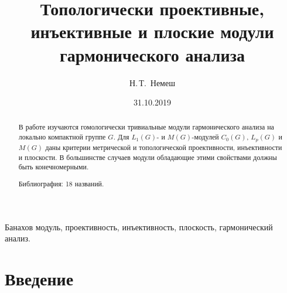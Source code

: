 \documentclass{article}
\numberwithin{equation}{section}
\theoremstyle{plain}
\theoremstyle{definition}
\begin{document}
\title{Топологически проективные, инъективные и плоские модули гармонического анализа}
\author[N.\,T.~Nemesh]{Н.\,Т.~Немеш}
\address{Московский государственный университет им.~М.\,В.~Ломоносова}

\date{31.10.2019}

\maketitle

\begin{fulltext}

\begin{abstract} В работе изучаются гомологически тривиальные модули 
гармонического анализа на локально компактной группе $G$. Для $L_1(G)$- и 
$M(G)$-модулей $C_0(G)$, $L_p(G)$ и $M(G)$ даны критерии метрической и 
топологической проективности, инъективности и плоскости. В большинстве случаев 
модули обладающие этими свойствами должны быть конечномерными.

Библиография: 18 названий.
\end{abstract}

\begin{keywords} 
Банахов модуль, проективность, инъективность, плоскость, гармонический анализ.
\end{keywords}




\section{Введение}\label{SectionIntroduction}


\end{fulltext}
\end{document}
